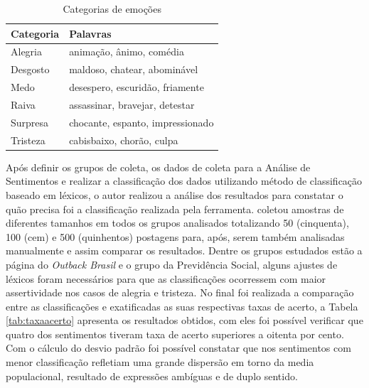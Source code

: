 \begin{table}[h!]
  \begin{center}
    \caption{Categorias de emoções}
    \label{tab:categoriaemo}
    \begin{tabular}{ll} %
      \textbf{Categoria} & \textbf{Palavras}\\
      \hline
      Alegria&animação, ânimo, comédia\\
      Desgosto&maldoso, chatear, abominável\\
      Medo&desespero, escuridão, friamente\\
      Raiva&assassinar, bravejar, detestar\\
      Surpresa&chocante, espanto, impressionado\\
      Tristeza&cabisbaixo, chorão, culpa\\
      \hline
    \end{tabular}
  \end{center}
\end{table}
Após definir os grupos de coleta, os dados de coleta para a Análise de Sentimentos e realizar a classificação dos dados utilizando método de classificação baseado em léxicos, o autor realizou a análise dos resultados para constatar o quão precisa foi a classificação realizada pela ferramenta.  coletou amostras de diferentes tamanhos em todos os grupos analisados totalizando 50 (cinquenta), 100 (cem) e 500 (quinhentos) postagens para, após, serem também analisadas manualmente e assim comparar os resultados. Dentre os grupos estudados estão a página do \textit{Outback Brasil} e o grupo da Previdência Social, alguns ajustes de léxicos foram necessários para que as classificações ocorressem com maior assertividade nos casos de alegria e tristeza. No final foi realizada a comparação entre as classificações e exatificadas as suas respectivas taxas de acerto, a Tabela \ref{tab:taxaacerto} apresenta os resultados obtidos, com eles foi possível verificar que quatro dos sentimentos tiveram taxa de acerto superiores a oitenta por cento. Com o cálculo do desvio padrão foi possível constatar que nos sentimentos com menor classificação refletiam uma grande dispersão em torno da media populacional, resultado de expressões ambíguas e de duplo sentido.

